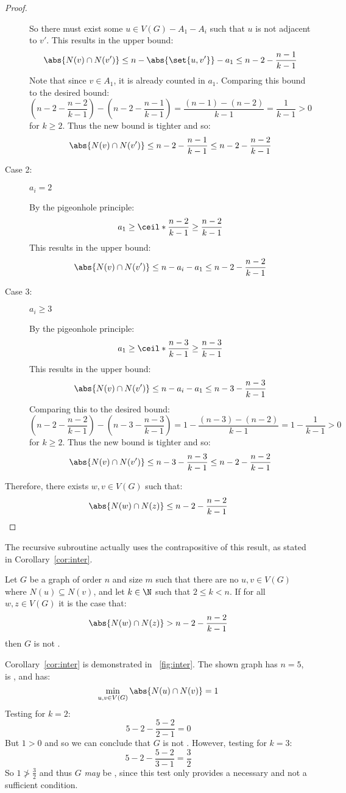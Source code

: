 \begin{proof}
\begin{description}
    So there must exist some \(u\in V(G)-A_1-A_i\) such that \(u\) is not adjacent to \(v'\).  This results in the
    upper bound:
    \[\abs{N(v)\cap N(v')}\le n-\abs{\set{u,v'}}-a_1\le n-2-\frac{n-1}{k-1}\]
    Note that since \(v\in A_1\), it is already counted in \(a_1\).  Comparing this bound to the desired bound:
    \[\left(n-2-\frac{n-2}{k-1}\right)-\left(n-2-\frac{n-1}{k-1}\right)=\frac{(n-1)-(n-2)}{k-1}=\frac{1}{k-1}>0\]
    for \(k\ge2\).  Thus the new bound is tighter and so:
    \[\abs{N(v)\cap N(v')}\le n-2-\frac{n-1}{k-1}\le n-2-\frac{n-2}{k-1}\]
    
  \item [Case 2:] \(a_i=2\)

    By the pigeonhole principle:
    \[a_1\ge\ceil*{\frac{n-2}{k-1}}\ge\frac{n-2}{k-1}\]
    This results in the upper bound:
    \[\abs{N(v)\cap N(v')}\le n-a_i-a_1\le n-2-\frac{n-2}{k-1}\]
    
  \item [Case 3:] \(a_i\ge3\)

    By the pigeonhole principle:
    \[a_1\ge\ceil*{\frac{n-3}{k-1}}\ge\frac{n-3}{k-1}\]
    This results in the upper bound:
    \[\abs{N(v)\cap N(v')}\le n-a_i-a_1\le n-3-\frac{n-3}{k-1}\]
    Comparing this to the desired bound:
    \[\left(n-2-\frac{n-2}{k-1}\right)-\left(n-3-\frac{n-3}{k-1}\right)=1-\frac{(n-3)-(n-2)}{k-1}=1-\frac{1}{k-1}>0\]
    for \(k\ge2\).  Thus the new bound is tighter and so:
    \[\abs{N(v)\cap N(v')}\le n-3-\frac{n-3}{k-1}\le n-2-\frac{n-2}{k-1}\]
  \end{description}

  Therefore, there exists \(w,v\in V(G)\) such that:
  \[\abs{N(w)\cap N(z)}\le n-2-\frac{n-2}{k-1}\]
\end{proof}

The recursive subroutine actually uses the contrapositive of this result, as stated in Corollary~\ref{cor:inter}.

\begin{corollary}
  \label{cor:inter}
  Let \(G\) be a graph of order \(n\) and size \(m\) such that there are no \(u,v\in V(G)\) where
  \(N(u)\subseteq N(v)\), and let \(k\in\N\) such that \(2\le k<n\).  If for all \(w,z\in V(G)\) it is the case
  that:
  \[\abs{N(w)\cap N(z)}>n-2-\frac{n-2}{k-1}\]
  then \(G\) is not .
\end{corollary}

Corollary~\ref{cor:inter} is demonstrated in \figurename~\ref{fig:inter}.  The shown graph has \(n=5\), is
, and has:
\[\min_{u,v\in V(G)}\abs{N(u)\cap N(v)}=1\]
Testing for \(k=2\):
\[5-2-\frac{5-2}{2-1}=0\]
But \(1>0\) and so we can conclude that \(G\) is not .  However, testing for \(k=3\):
\[5-2-\frac{5-2}{3-1}=\frac{3}{2}\]
So \(1\ngtr\frac{3}{2}\) and thus \(G\) \emph{may} be , since this test only provides a necessary and
not a sufficient condition.

